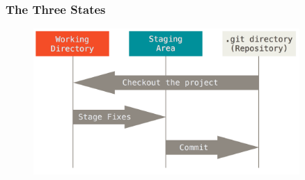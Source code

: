 
\begin{frame}
    \frametitle{The Three States}
    \begin{figure}[b]{\textwidth}
        \centering
        \includegraphics[width=0.9\textwidth]{../img/three_states.png}
    \end{figure}
\end{frame}

